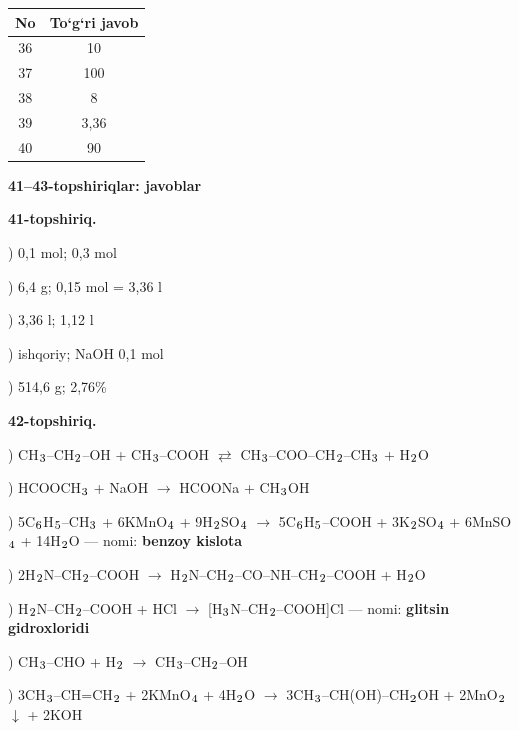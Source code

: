 \documentclass[11pt,a4paper]{article}
\renewcommand{\textsubscript}[1]{\ensuremath{_{\text{\fontsize{8}{8}\selectfont #1}}}}
\begin{document}
\noindent\begin{tabular}{|c|c|}\hline \textbf{No} & \textbf{To`g`ri javob}\\\hline
36 & 10\\\hline
37 & 100\\\hline
38 & 8\\\hline
39 & 3,36\\\hline
40 & 90\\\hline
\end{tabular}\par\medskip
\noindent\textbf{41--43-topshiriqlar: javoblar}\par\smallskip
\noindent\textbf{41-topshiriq.}\par
{}) 0,1 mol; 0,3 mol\par
{}) 6,4 g; 0,15 mol = 3,36 l\par
{}) 3,36 l; 1,12 l\par
{}) ishqoriy; NaOH 0,1 mol\par
{}) 514,6 g; 2,76\%\par
\noindent\textbf{42-topshiriq.}\par
{}) CH\textsubscript{3}--CH\textsubscript{2}--OH + CH\textsubscript{3}--COOH $\rightleftarrows$ CH\textsubscript{3}--COO--CH\textsubscript{2}--CH\textsubscript{3} + H\textsubscript{2}O\par
{}) HCOOCH\textsubscript{3} + NaOH $\to$ HCOONa + CH\textsubscript{3}OH\par
{}) 5C\textsubscript{6}H\textsubscript{5}--CH\textsubscript{3} + 6KMnO\textsubscript{4} + 9H\textsubscript{2}SO\textsubscript{4} $\to$ 5C\textsubscript{6}H\textsubscript{5}--COOH + 3K\textsubscript{2}SO\textsubscript{4} + 6MnSO\textsubscript{4} + 14H\textsubscript{2}O --- nomi: \textbf{benzoy kislota}\par
{}) 2H\textsubscript{2}N--CH\textsubscript{2}--COOH $\to$ H\textsubscript{2}N--CH\textsubscript{2}--CO--NH--CH\textsubscript{2}--COOH + H\textsubscript{2}O\par
{}) H\textsubscript{2}N--CH\textsubscript{2}--COOH + HCl $\to$ [H\textsubscript{3}N--CH\textsubscript{2}--COOH]Cl --- nomi: \textbf{glitsin gidroxloridi}\par
{}) CH\textsubscript{3}--CHO + H\textsubscript{2} $\to$ CH\textsubscript{3}--CH\textsubscript{2}--OH\par
{}) 3CH\textsubscript{3}--CH=CH\textsubscript{2} + 2KMnO\textsubscript{4} + 4H\textsubscript{2}O $\to$ 3CH\textsubscript{3}--CH(OH)--CH\textsubscript{2}OH + 2MnO\textsubscript{2}$\downarrow$ + 2KOH\par
\end{document}
